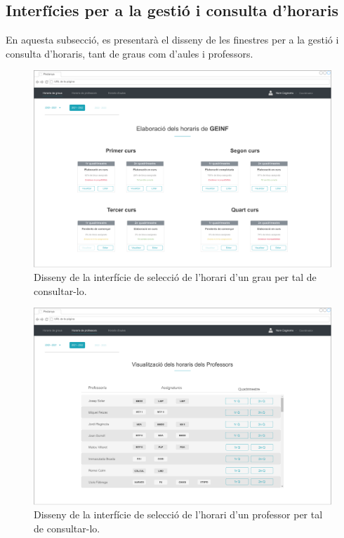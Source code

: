 \documentclass[a4paper,12pt]{ThesisStyle}
\begin{document}
\subsection{Interfícies per a la gestió i consulta d'horaris}
\label{subsec:interficies_consulta_gestio_horaris}

En aquesta subsecció, es presentarà el disseny de les finestres per a la gestió i consulta d'horaris, tant de graus com d'aules i professors.

\begin{figure}[H]
	\centering
	\includegraphics[width=\textwidth]{assets/interfaces/coordinadors/horarisGraus/selHorari.pdf}
	\caption{\label{img:horarisGraus_selHorari}Disseny de la interfície de selecció de l'horari d'un grau per tal de consultar-lo.}
\end{figure}

\begin{figure}[H]
	\centering
	\includegraphics[width=\textwidth]{assets/interfaces/coordinadors/horarisProfessors/main.pdf}
	\caption{\label{img:horarisProfessors_main}Disseny de la interfície de selecció de l'horari d'un professor per tal de consultar-lo.}
\end{figure}
\end{document}
